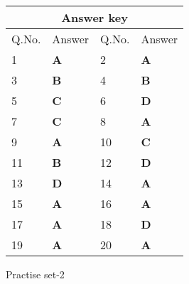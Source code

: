 \begin{table}[H]
	\centering
	\begin{tabular}{|p{1.5cm}|p{1.5cm}||p{1.5cm}|p{1.5cm}|}
		\hline
		\multicolumn{4}{|c|}{\textbf{Answer key}}\\\hline\hline
		\rowcolor{ocrel}Q.No.&Answer&Q.No.&Answer\\\hline
		1&\textbf{A} &2&\textbf{A}\\\hline 
		3&\textbf{B} &4&\textbf{B} \\\hline
		5&\textbf{C} &6&\textbf{D} \\\hline
		7&\textbf{C}&8&\textbf{A}\\\hline
		9&\textbf{A}&10&\textbf{C}\\\hline
		11&\textbf{B}&12&\textbf{D}\\\hline
		13&\textbf{D}&14&\textbf{A}\\\hline
		15&\textbf{A}&16&\textbf{A}\\\hline
		17&\textbf{A} &18&\textbf{D}\\\hline
		19&\textbf{A}&20&\textbf{A}\\\hline
		
	\end{tabular}
\end{table}
\newpage
\begin{abox}
	Practise set-2
\end{abox}
